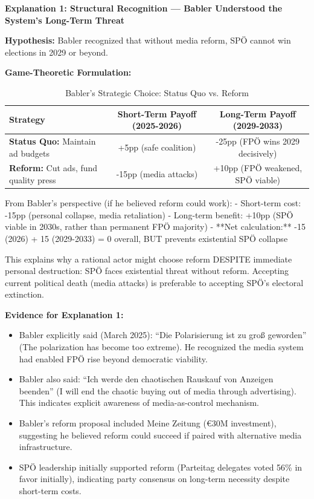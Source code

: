 \textbf{Explanation 1: Structural Recognition — Babler Understood the System's Long-Term Threat}

\textbf{Hypothesis:} Babler recognized that without media reform, SPÖ cannot win elections in 2029 or beyond.

\textbf{Game-Theoretic Formulation:}

\begin{table}[h]
\centering
\caption{Babler's Strategic Choice: Status Quo vs. Reform}
\label{tab:dx-babler-payoffs}
\begin{tabular}{|l|c|c|}
\hline
\textbf{Strategy} & \textbf{Short-Term Payoff (2025-2026)} & \textbf{Long-Term Payoff (2029-2033)} \\
\hline
\textbf{Status Quo:} Maintain ad budgets & +5pp (safe coalition) & -25pp (FPÖ wins 2029 decisively) \\
\hline
\textbf{Reform:} Cut ads, fund quality press & -15pp (media attacks) & +10pp (FPÖ weakened, SPÖ viable) \\
\hline
\end{tabular}
\end{table}

From Babler's perspective (if he believed reform could work):
- Short-term cost: -15pp (personal collapse, media retaliation)
- Long-term benefit: +10pp (SPÖ viable in 2030s, rather than permanent FPÖ majority)
- **Net calculation:** -15 (2026) + 15 (2029-2033) = 0 overall, BUT prevents existential SPÖ collapse

This explains why a rational actor might choose reform DESPITE immediate personal destruction: SPÖ faces
existential threat without reform. Accepting current political death (media attacks) is preferable to
accepting SPÖ's electoral extinction.

\textbf{Evidence for Explanation 1:}

\begin{itemize}
\item Babler explicitly said (March 2025): ``Die Polarisierung ist zu groß geworden'' (The polarization has
  become too extreme). He recognized the media system had enabled FPÖ rise beyond democratic viability.

\item Babler also said: ``Ich werde den chaotischen Rauskauf von Anzeigen beenden'' (I will end the chaotic
  buying out of media through advertising). This indicates explicit awareness of media-as-control mechanism.

\item Babler's reform proposal included Meine Zeitung (€30M investment), suggesting he believed reform could
  succeed if paired with alternative media infrastructure.

\item SPÖ leadership initially supported reform (Parteitag delegates voted 56\% in favor initially), indicating
  party consensus on long-term necessity despite short-term costs.

\end{itemize}

